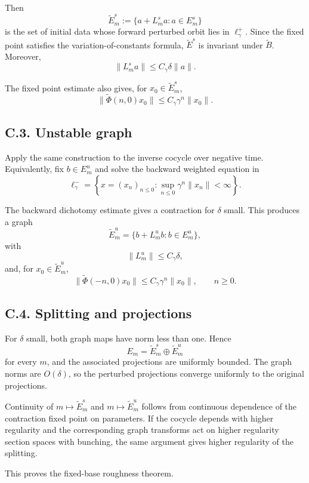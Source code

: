 \documentclass[12pt,a4paper]{article}
\theoremstyle{plain}
\numberwithin{equation}{section}
\numberwithin{theorem}{section}
\begin{document}
Then
\[
\widetilde E_m^s:=\{a+L_m^s a:a\in E_m^s\}
\]
is the set of initial data whose forward perturbed orbit lies in $\ell_\gamma^+$. Since the fixed point satisfies the variation-of-constants formula, $\widetilde E^s$ is invariant under $\widetilde B$. Moreover,
\[
\|L_m^s a\|
\le C_\gamma\delta\|a\|.
\]

The fixed point estimate also gives, for $x_0\in\widetilde E_m^s$,
\[
\|\widetilde\Phi(n,0)x_0\|
\le
C_\gamma\gamma^n\|x_0\|.
\]

\subsection{C.3. Unstable graph}

Apply the same construction to the inverse cocycle over negative time. Equivalently, fix $b\in E_m^u$ and solve the backward weighted equation in
\[
\ell_\gamma^-=
\left\{
x=(x_n)_{n\le0}:
\sup_{n\le0}\gamma^{n}\|x_n\|<\infty
\right\}.
\]

The backward dichotomy estimate gives a contraction for $\delta$ small. This produces a graph
\[
\widetilde E_m^u=
\{b+L_m^u b:b\in E_m^u\},
\]
with
\[
\|L_m^u\|
\le C_\gamma\delta,
\]
and, for $x_0\in\widetilde E_m^u$,
\[
\|\widetilde\Phi(-n,0)x_0\|
\le
C_\gamma\gamma^n\|x_0\|,
\qquad n\ge0.
\]

\subsection{C.4. Splitting and projections}

For $\delta$ small, both graph maps have norm less than one. Hence
\[
E_m=\widetilde E_m^s\oplus\widetilde E_m^u
\]
for every $m$, and the associated projections are uniformly bounded. The graph norms are $O(\delta)$, so the perturbed projections converge uniformly to the original projections.

Continuity of $m\mapsto \widetilde E_m^s$ and $m\mapsto \widetilde E_m^u$ follows from continuous dependence of the contraction fixed point on parameters. If the cocycle depends with higher regularity and the corresponding graph transforms act on higher regularity section spaces with bunching, the same argument gives higher regularity of the splitting.

This proves the fixed-base roughness theorem.

\clearpage

\end{document}
